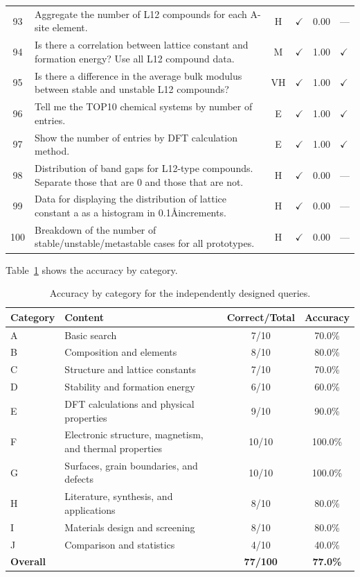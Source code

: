 \documentclass[5p,twocolumn]{elsarticle}
\begin{document}
\begin{longtable}{clcccl}
    93 & Aggregate the number of L12 compounds for each A-site element. & H & $\checkmark$ & 0.00 & --- \\
    94 & Is there a correlation between lattice constant and formation energy? Use all L12 compound data. & M & $\checkmark$ & 1.00 & $\checkmark$ \\
    95 & Is there a difference in the average bulk modulus between stable and unstable L12 compounds? & VH & $\checkmark$ & 1.00 & $\checkmark$ \\
    96 & Tell me the TOP10 chemical systems by number of entries. & E & $\checkmark$ & 1.00 & $\checkmark$ \\
    97 & Show the number of entries by DFT calculation method. & E & $\checkmark$ & 1.00 & $\checkmark$ \\
    98 & Distribution of band gaps for L12-type compounds. Separate those that are 0 and those that are not. & H & $\checkmark$ & 0.00 & --- \\
    99 & Data for displaying the distribution of lattice constant a as a histogram in 0.1\AA  increments. & H & $\checkmark$ & 0.00 & --- \\
    100 & Breakdown of the number of stable/unstable/metastable cases for all prototypes. & H & $\checkmark$ & 0.00 & --- \\
\end{longtable}

Table~\ref{tab:sup_expert_category} shows the accuracy by category.

\begin{table}[htbp]
  \centering
  \caption{Accuracy by category for the independently designed queries.}
  \label{tab:sup_expert_category}
  \small
  \begin{tabular}{llcc}
    \toprule
    Category & Content & Correct/Total & Accuracy \\
    \midrule
    A & Basic search & 7/10 & 70.0\% \\
    B & Composition and elements & 8/10 & 80.0\% \\
    C & Structure and lattice constants & 7/10 & 70.0\% \\
    D & Stability and formation energy & 6/10 & 60.0\% \\
    E & DFT calculations and physical properties & 9/10 & 90.0\% \\
    F & Electronic structure, magnetism, and thermal properties & 10/10 & 100.0\% \\
    G & Surfaces, grain boundaries, and defects & 10/10 & 100.0\% \\
    H & Literature, synthesis, and applications & 8/10 & 80.0\% \\
    I & Materials design and screening & 8/10 & 80.0\% \\
    J & Comparison and statistics & 4/10 & 40.0\% \\
    \midrule
    \textbf{Overall} & & \textbf{77/100} & \textbf{77.0\%} \\
    \bottomrule
  \end{tabular}
\end{table}
\end{document}
